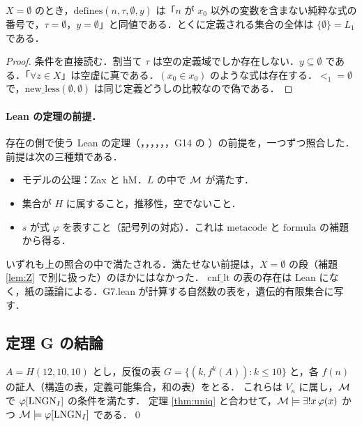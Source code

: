 \begin{lemma}[最初の段]\label{lem:Z}
$X=\emptyset$ のとき，$\mathrm{defines}(n,\tau,\emptyset,y)$ は「$n$ が $x_0$ 以外の変数を含まない純粋な式の番号で，$\tau=\emptyset$，$y=\emptyset$」と同値である．とくに定義される集合の全体は $\{\emptyset\}=L_1$ である．
\end{lemma}
\begin{proof}
条件を直接読む．割当て $\tau$ は空の定義域でしか存在しない．$y\subseteq\emptyset$ である．「$\forall z\in X$」は空虚に真である．$(x_0\in x_0)$ のような式は存在する．$<_1=\emptyset$ で，$\mathrm{new\_less}(\emptyset,\emptyset)$ は同じ定義どうしの比較なので偽である．
\end{proof}

\paragraph{Lean の定理の前提．}
存在の側で使う Lean の定理（，，，，，，G14 の ）の前提を，一つずつ照合した．前提は次の三種類である．
\begin{itemize}
\item モデルの公理：Zax と hM．$L$ の中で $\mathcal{M}$ が満たす．
\item 集合が $H$ に属すること，推移性，空でないこと．
\item $s$ が式 $\varphi$ を表すこと（記号列の対応）．これは $\mathrm{metacode}$ と $\mathrm{formula}$ の補題から得る．
\end{itemize}
いずれも上の照合の中で満たされる．満たせない前提は，$X=\emptyset$ の段（補題 \ref{lem:Z} で別に扱った）のほかにはなかった．
$\mathrm{cnf\_lt}$ の表の存在は Lean になく，紙の議論による．G7.lean が計算する自然数の表を，遺伝的有限集合に写す．

\subsection{定理 G の結論}
$A=H(12,10,10)$ とし，反復の表 $G=\{(k,f^k(A)):k\le 10\}$ と，各 $f(n)$ の証人（構造の表，定義可能集合，和の表）をとる．
これらは $V_\kappa$ に属し，$\mathcal{M}$ で $\varphi[\mathrm{LNGN}_I]$ の条件を満たす．
定理 \ref{thm:uniq} と合わせて，$\mathcal{M}\models\exists!x\,\varphi(x)$ かつ $\mathcal{M}\models\varphi[\mathrm{LNGN}_I]$ である．\qed

